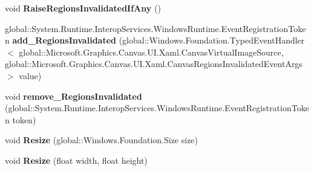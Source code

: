 \begin{DoxyCompactItemize}
\mbox{\label{class_microsoft_1_1_graphics_1_1_canvas_1_1_u_i_1_1_xaml_1_1_canvas_virtual_image_source_acd73537ab914ef14e5e244675ca193a1}} 
void {\bfseries Raise\+Regions\+Invalidated\+If\+Any} ()
\item 
\mbox{\label{class_microsoft_1_1_graphics_1_1_canvas_1_1_u_i_1_1_xaml_1_1_canvas_virtual_image_source_a46f564da4b1f510265fd609033699076}} 
global\+::\+System.\+Runtime.\+Interop\+Services.\+Windows\+Runtime.\+Event\+Registration\+Token {\bfseries add\+\_\+\+Regions\+Invalidated} (global\+::\+Windows.\+Foundation.\+Typed\+Event\+Handler$<$ global\+::\+Microsoft.\+Graphics.\+Canvas.\+U\+I.\+Xaml.\+Canvas\+Virtual\+Image\+Source, global\+::\+Microsoft.\+Graphics.\+Canvas.\+U\+I.\+Xaml.\+Canvas\+Regions\+Invalidated\+Event\+Args $>$ value)
\item 
\mbox{\label{class_microsoft_1_1_graphics_1_1_canvas_1_1_u_i_1_1_xaml_1_1_canvas_virtual_image_source_a137832e2a437516e4b042f34a8da2bde}} 
void {\bfseries remove\+\_\+\+Regions\+Invalidated} (global\+::\+System.\+Runtime.\+Interop\+Services.\+Windows\+Runtime.\+Event\+Registration\+Token token)
\item 
\mbox{\label{class_microsoft_1_1_graphics_1_1_canvas_1_1_u_i_1_1_xaml_1_1_canvas_virtual_image_source_ac6286392a14c2a5995e9eb313e6d1b10}} 
void {\bfseries Resize} (global\+::\+Windows.\+Foundation.\+Size size)
\item 
\mbox{\label{class_microsoft_1_1_graphics_1_1_canvas_1_1_u_i_1_1_xaml_1_1_canvas_virtual_image_source_adc3ef1fa23c6bfa405a644561183b88f}} 
void {\bfseries Resize} (float width, float height)
\item 
\mbox{\label{class_microsoft_1_1_graphics_1_1_canvas_1_1_u_i_1_1_xaml_1_1_canvas_virtual_image_source_aab3cb8ea864e0d0639ab6ad043256e06}} 

\end{DoxyCompactItemize}

